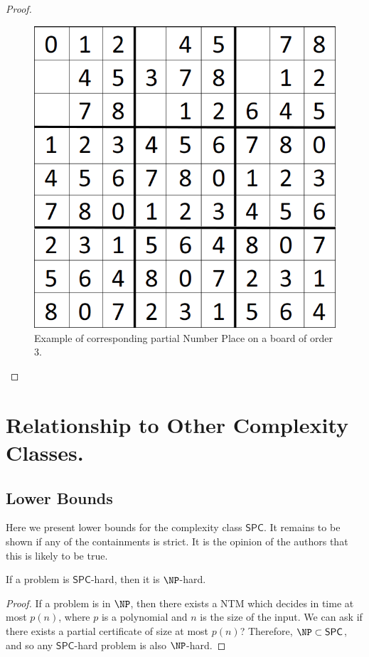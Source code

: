 \documentclass[runningheads,a4paper]{llncs}
\begin{document}
\begin{proof}
\begin{figure}[H]
\label{fig:partialNP}
\centering
\includegraphics[scale=0.25]{sudoku-1.png}
\caption{Example of corresponding partial Number Place on a board of order 3.}
\end{figure}

\end{proof}

\section{Relationship to Other Complexity Classes.}

\subsection{Lower Bounds}

Here we present lower bounds for the complexity class $\mathsf{SPC}$. It remains to be shown if any of the containments is strict. It is the opinion of the authors that this is likely to be true. 

\begin{proposition}
If a problem is $\mathsf{SPC}$-hard, then it is $\NP$-hard.
\end{proposition}

\begin{proof}
If a problem is in $\NP$, then there exists a NTM which decides in time at most $p(n)$, where $p$ is a polynomial and $n$ is the size of the input. We can ask if there exists a partial certificate of size at most $p(n)$? Therefore, $\NP \subset \mathsf{SPC}$, and so any $\mathsf{SPC}$-hard problem is also $\NP$-hard. 
\end{proof}
\end{document}
